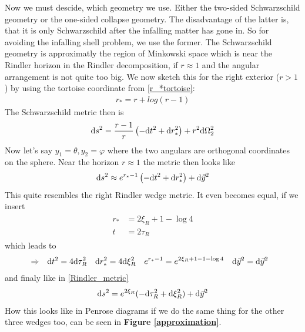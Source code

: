 Now we must descide, which geometry we use. Either the two-sided Schwarzschild geometry or the one-sided collapse geometry. The disadvantage of the latter is, that it is only Schwarzschild after the infalling matter has gone in. So for avoiding the infalling shell problem, we use the former. 
The Schwarzschild geometry is approximatly the region of Minkowski space which is near the Rindler horizon in the Rindler decomposition, if $r \approx 1$ and the angular arrangement is not quite too big. We now sketch this for the right exterior ($r>1$) by using the tortoise coordinate from \eqref{r_*tortoise}:
	\begin{align*}
		r_*=r + log(r-1)
	\end{align*}
The Schwarzschild metric then is
	\begin{align}
		\mathrm{d} s^2=\frac{r-1}{r}\left(-\mathrm{d} t^2 + \mathrm{d} r^2_*\right) + r^2 \mathrm{d} \Omega^2_2
	\end{align}
Now let's say $y_1=\theta, y_2=\varphi$ where the two angulars are orthogonal coordinates on the sphere. Near the horizon $r\approx1$ the metric then looks like 
	\begin{align}
		\mathrm{d} s^2 \approx e^{r_* - 1} \left(-\mathrm{d} t^2 + \mathrm{d} r^2_*\right) + \mathrm{d} \vec{y}^2
	\end{align}
This quite resembles the right Rindler wedge metric. It even becomes equal, if we insert
	\begin{align} \label{again_rindler_coord}
		\begin{split}
			r_*&= 2\xi_R + 1 - \log 4 \\
			t &= 2\tau_R
		\end{split}
	\end{align}
which leads to
	\begin{align*}
		&\Rightarrow &
		\mathrm{d} t^2 &= 4 \mathrm{d} \tau_R^2 & \mathrm{d} r_*^2 &= 4 \mathrm{d} \xi_R^2 &e^{r_* -1} &= e^{2\xi_R + 1 - 1 - \log 4} & \mathrm{d} \vec{y}^2 &= \mathrm{d} \vec{y}^2
	\end{align*}
and finaly like in \eqref{Rindler_metric}
	\begin{align*}
		\mathrm{d} s^2 = e^{2\xi_R} (-\mathrm{d} \tau_R^2 + \mathrm{d} \xi_R^2) + \mathrm{d} \vec{y}^2 
	\end{align*}
How this looks like in Penrose diagrams if we do the same thing for the other three wedges too, can be seen in \textbf{Figure \ref{approximation}}.
